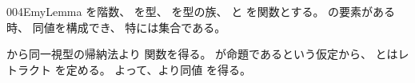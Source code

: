 \documentclass[index]{subfiles}
\begin{document}
\begin{myBlock}{004E}{myLemma}
  を階数、
  を型、
  を型の族、
  と
  を関数とする。
  の要素がある時、
  同値を構成でき、
  特には集合である。
\end{myBlock}
\begin{myProof}
  から同一視型の帰納法より
  関数を得る。
  が命題であるという仮定から、
  とはレトラクト
  を定める。
  よって、より同値
  を得る。
\end{myProof}
\end{document}
